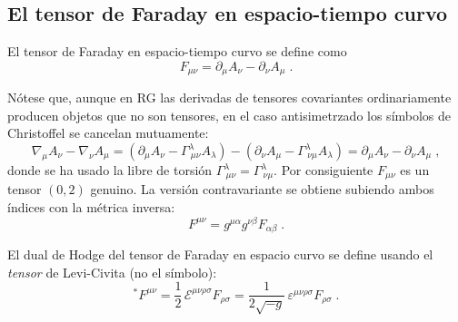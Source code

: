         \subsection{El tensor de Faraday en espacio-tiempo curvo}\label{subsec:Faraday}

            \begin{myDef}
                El tensor de Faraday en espacio-tiempo curvo se define como
                \begin{equation}\label{eq:FaradayCurvo}
                    F_{\mu\nu} = \partial_{\mu}A_{\nu} - \partial_{\nu}A_{\mu}\;.
                \end{equation}
            \end{myDef}

            Nótese que, aunque en RG las derivadas de tensores covariantes ordinariamente producen objetos que no son tensores, en el caso antisimetrzado los símbolos de Christoffel se cancelan mutuamente:
            \begin{equation*}
                \nabla_{\mu}A_{\nu} - \nabla_{\nu}A_{\mu}
                = (\partial_{\mu}A_{\nu} - \Gamma^{\lambda}_{\ \mu\nu}A_{\lambda})
                - (\partial_{\nu}A_{\mu} - \Gamma^{\lambda}_{\ \nu\mu}A_{\lambda})
                = \partial_{\mu}A_{\nu} - \partial_{\nu}A_{\mu}\;,
            \end{equation*}
            donde se ha usado la libre de torsión $\Gamma^{\lambda}_{\ \mu\nu}= \Gamma^{\lambda}_{\ \nu\mu}$.  Por consiguiente $F_{\mu\nu}$ es un tensor $(0,2)$ genuino. La versión contravariante se obtiene subiendo ambos índices con la métrica inversa:
            \begin{equation}\label{eq:FContra}
                F^{\mu\nu} = g^{\mu\alpha}g^{\nu\beta}F_{\alpha\beta}\;.
            \end{equation}

            \begin{myDef}
                \label{def:Dual}
                El dual de Hodge del tensor de Faraday en espacio curvo se define usando
                el \emph{tensor} de Levi-Civita (no el símbolo):
                \begin{equation}\label{eq:DualCurvo}
                    {}^{*}F^{\mu\nu}
                        = \frac{1}{2}\,\mathcal{E}^{\mu\nu\rho\sigma}F_{\rho\sigma}
                        = \frac{1}{2\sqrt{-g}}\,\varepsilon^{\mu\nu\rho\sigma}F_{\rho\sigma}\;.
                \end{equation}
            \end{myDef}

